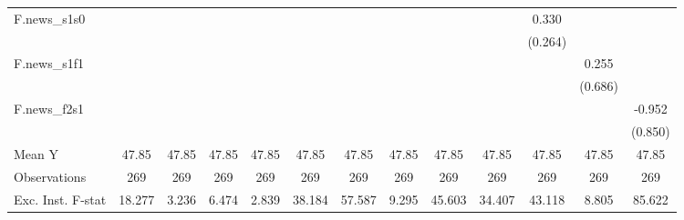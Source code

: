 {\begin{tabular}{l*{12}{c}}
\addlinespace
F.news\_s1s0 &                     &                     &                     &                     &                     &                     &                     &                     &                     &       0.330         &                     &                     \\
            &                     &                     &                     &                     &                     &                     &                     &                     &                     &     (0.264)         &                     &                     \\
\addlinespace
F.news\_s1f1 &                     &                     &                     &                     &                     &                     &                     &                     &                     &                     &       0.255         &                     \\
            &                     &                     &                     &                     &                     &                     &                     &                     &                     &                     &     (0.686)         &                     \\
\addlinespace
F.news\_f2s1 &                     &                     &                     &                     &                     &                     &                     &                     &                     &                     &                     &      -0.952         \\
            &                     &                     &                     &                     &                     &                     &                     &                     &                     &                     &                     &     (0.850)         \\
\midrule
Mean Y      &       47.85         &       47.85         &       47.85         &       47.85         &       47.85         &       47.85         &       47.85         &       47.85         &       47.85         &       47.85         &       47.85         &       47.85         \\
Observations&         269         &         269         &         269         &         269         &         269         &         269         &         269         &         269         &         269         &         269         &         269         &         269         \\
Exc. Inst. F-stat&      18.277         &       3.236         &       6.474         &       2.839         &      38.184         &      57.587         &       9.295         &      45.603         &      34.407         &      43.118         &       8.805         &      85.622         \\
\bottomrule
\end{tabular}
}
